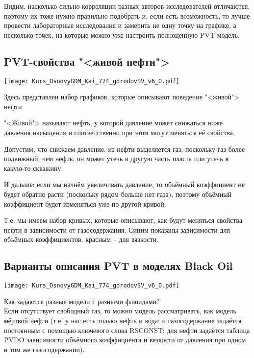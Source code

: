 \documentclass[main.tex]{subfiles}
\begin{document}
Видим, насколько сильно корреляции разных авторов-исследователей отличаются, поэтому их тоже нужно правильно подобрать и, если есть возможность, то лучше провести лабораторные исследования и замерить не одну точку на графике, а несколько точек, на которые можно уже настроить полноценную PVT-модель.

\subsection{PVT-свойства "<живой нефти">}

\texttt{[image: Kurs\_OsnovyGDM\_Kai\_774\_gorodovSV\_v6\_0.pdf]}

Здесь представлен набор графиков, которые описывают поведение "<живой"> нефти.

"<Живой"> называют нефть, у которой давление может снижаться ниже давления насыщения и соответственно при этом могут меняться её свойства.

Допустим, что снижаем давление, из нефти выделяется газ, поскольку газ более подвижный, чем нефть, он может утечь в другую часть пласта или утечь в какую-то скважину.

И дальше: если мы начнём увеличивать давление, то объёмный коэффициент не будет обратно расти (поскольку рядом больше нет газа), поэтому объёмный коэффициент будет изменяться уже по другой кривой.

Т.е. мы имеем набор кривых, которые описывают, как будут меняться свойства нефти в зависимости от газосодержания.
Синим показаны зависимости для объёмных коэффициентов, красным -- для вязкости.

\subsection{Варианты описания PVT в моделях Black Oil}

\texttt{[image: Kurs\_OsnovyGDM\_Kai\_774\_gorodovSV\_v6\_0.pdf]}

Как задаются разные модели с разными флюидами?
\\

Если отсутствует свободный газ, то можно модель рассматривать, как модель мёртвой нефти (т.е. у нас есть только нефть и вода; и газосодержание задаётся постоянным с помощью ключевого слова RSCONST; для нефти задаётся таблица PVDO зависимости объёмного коэффициента и вязкости от давления при одном и том же газосодержании).
\\
\end{document}
